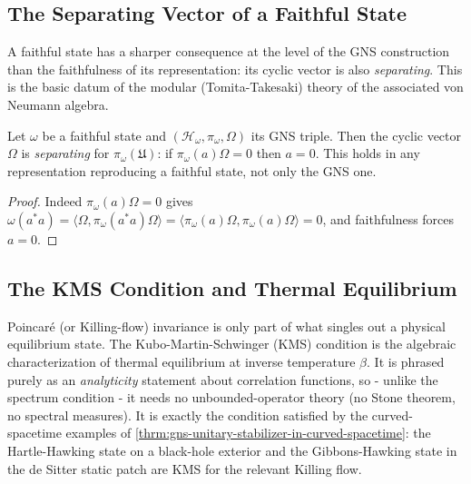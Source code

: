 \subsection{The Separating Vector of a Faithful State}

A faithful state has a sharper consequence at the level of the GNS construction than the faithfulness of its representation: its cyclic vector is also \emph{separating}. This is the basic datum of the modular (Tomita-Takesaki) theory of the associated von Neumann algebra.

\begin{theorem}
    \label{thrm:separating-faithful}
    \leanok
    Let $\omega$ be a faithful state and $(\mathcal{H}_\omega, \pi_\omega, \Omega)$ its GNS triple. Then the cyclic vector $\Omega$ is \emph{separating} for $\pi_\omega(\mathfrak{U})$: if $\pi_\omega(a)\Omega = 0$ then $a = 0$. This holds in any representation reproducing a faithful state, not only the GNS one.
\end{theorem}
\begin{proof}
    \leanok
    Indeed $\pi_\omega(a)\Omega = 0$ gives $\omega(a^* a) = \langle \Omega, \pi_\omega(a^* a)\Omega\rangle = \langle \pi_\omega(a)\Omega, \pi_\omega(a)\Omega\rangle = 0$, and faithfulness forces $a = 0$.
\end{proof}

\subsection{The KMS Condition and Thermal Equilibrium}

Poincar\'e (or Killing-flow) invariance is only part of what singles out a physical equilibrium state. The Kubo-Martin-Schwinger (KMS) condition is the algebraic characterization of thermal equilibrium at inverse temperature $\beta$. It is phrased purely as an \emph{analyticity} statement about correlation functions, so - unlike the spectrum condition - it needs no unbounded-operator theory (no Stone theorem, no spectral measures). It is exactly the condition satisfied by the curved-spacetime examples of \ref{thrm:gns-unitary-stabilizer-in-curved-spacetime}: the Hartle-Hawking state on a black-hole exterior and the Gibbons-Hawking state in the de Sitter static patch are KMS for the relevant Killing flow.

